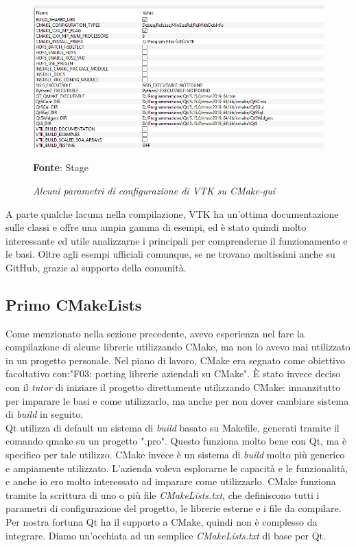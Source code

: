 \begin{figure}[h]
    \centering
    \includegraphics[width=1\textwidth]{immagini/svolgimento/vtkcmake.png}
    \caption{\textit{Alcuni parametri di configurazione di VTK su CMake-gui}}
    \textbf{Fonte}: Stage
    \label{fig: VTK CMAKE}
\end{figure}

A parte qualche lacuna nella compilazione, VTK ha un'ottima documentazione sulle classi e offre una ampia gamma di esempi, ed è stato quindi molto interessante ed utile analizzarne i principali per comprenderne il funzionamento e le basi. Oltre agli esempi ufficiali comunque, se ne trovano moltissimi anche su GitHub, grazie al supporto della comunità.

\subsection{Primo CMakeLists}\label{sec:primo-cmake}
Come menzionato nella sezione precedente, avevo esperienza nel fare la compilazione di alcune librerie utilizzando CMake, ma non lo avevo mai utilizzato in un progetto personale. Nel piano di lavoro, CMake era segnato come obiettivo facoltativo con:"F03: porting librerie aziendali su CMake". \`E stato invece deciso con il \emph{tutor} di iniziare il progetto direttamente utilizzando CMake: innanzitutto per imparare le basi e come utilizzarlo, ma anche per non dover cambiare sistema di \emph{build} in seguito.
\\
Qt utilizza di default un sistema di \emph{build} basato su Makefile, generati tramite il comando qmake su un progetto ".pro". Questo funziona molto bene con Qt, ma è specifico per tale utilizzo. CMake invece è un sistema di \emph{build} molto più generico e ampiamente utilizzato. L'azienda voleva esplorarne le capacità e le funzionalità, e anche io ero molto interessato ad imparare come utilizzarlo. CMake funziona tramite la scrittura di uno o più file \emph{CMakeLists.txt}, che definiscono tutti i parametri di configurazione del progetto, le librerie esterne e i file da compilare. Per nostra fortuna Qt ha il supporto a CMake, quindi non è complesso da integrare. Diamo un'occhiata ad un semplice \emph{CMakeLists.txt} di base per Qt.

